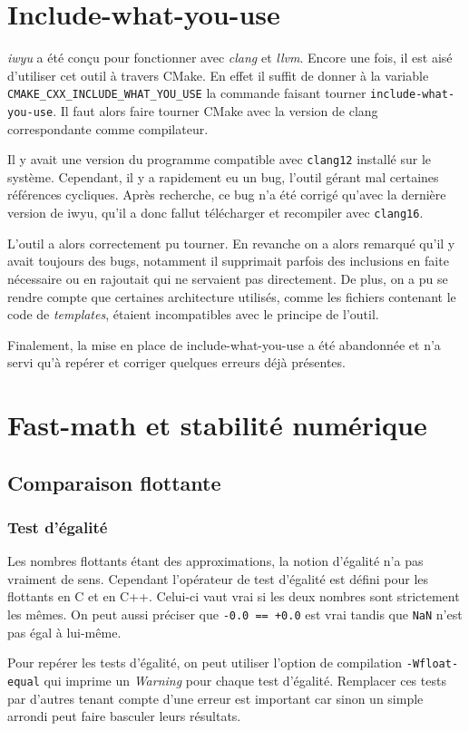 \documentclass[a4paper]{report}
\begin{document}
\section{Include-what-you-use}
\emph{iwyu} a été conçu pour fonctionner avec \emph{clang} et \emph{llvm}.
Encore une fois, il est aisé d'utiliser cet outil à travers CMake.
En effet il suffit de donner à la variable \verb'CMAKE_CXX_INCLUDE_WHAT_YOU_USE' la commande faisant tourner \verb'include-what-you-use'.
Il faut alors faire tourner CMake avec la version de clang correspondante comme compilateur.

Il y avait une version du programme compatible avec \verb'clang12' installé sur le système.
Cependant, il y a rapidement eu un bug, l'outil gérant mal certaines références cycliques.
Après recherche, ce bug n'a été corrigé qu'avec la dernière version de iwyu, qu'il a donc fallut télécharger et recompiler avec \verb'clang16'.

L'outil a alors correctement pu tourner.
En revanche on a alors remarqué qu'il y avait toujours des bugs, notamment il supprimait parfois des inclusions en faite nécessaire ou en rajoutait qui ne servaient pas directement.
De plus, on a pu se rendre compte que certaines architecture utilisés, comme les fichiers contenant le code de \emph{templates}, étaient incompatibles avec le principe de l'outil.

Finalement, la mise en place de include-what-you-use a été abandonnée et n'a servi qu'à repérer et corriger quelques erreurs déjà présentes.

\section{Fast-math et stabilité numérique}
\subsection{Comparaison flottante}
\subsubsection{Test d'égalité}
Les nombres flottants étant des approximations, la notion d'égalité n'a pas vraiment de sens.
Cependant l'opérateur de test d'égalité est défini pour les flottants en C et en C++.
Celui-ci vaut vrai si les deux nombres sont strictement les mêmes.
On peut aussi préciser que \verb'-0.0 == +0.0' est vrai tandis que \verb'NaN' n'est pas égal à lui-même.

Pour repérer les tests d'égalité, on peut utiliser l'option de compilation \verb'-Wfloat-equal' qui imprime un \emph{Warning} pour chaque test d'égalité.
Remplacer ces tests par d'autres tenant compte d'une erreur est important car sinon un simple arrondi peut faire basculer leurs résultats.
\end{document}
